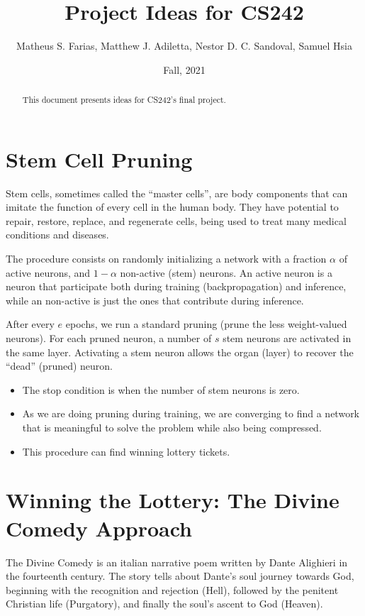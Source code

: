 \documentclass[abstract=true]{scrartcl}
\begin{document}
\title{Project Ideas for CS242}
\date{Fall, 2021}

\author{Matheus S. Farias, Matthew J. Adiletta, Nestor D. C. Sandoval, Samuel Hsia
  }

\maketitle

\begin{abstract}
    This document presents ideas for CS242's final project.
\end{abstract}

\tableofcontents

\section{Stem Cell Pruning}
Stem cells, sometimes called the ``master cells'', are body components that can imitate
the function of every cell in the human body. They have potential to repair,
restore, replace, and regenerate cells, being used to treat many medical conditions and diseases.

The procedure consists on randomly initializing a network with a fraction $\alpha$ of 
active neurons, and $1-\alpha$ non-active (stem) neurons. An active neuron is 
a neuron that participate both during training (backpropagation) and inference, while
an non-active is just the ones that contribute during inference.

After every $e$ epochs, we run a standard pruning (prune the less weight-valued neurons).
For each pruned neuron, a number of $s$ stem neurons are activated in the same layer. Activating
a stem neuron allows the organ (layer) to recover the ``dead'' (pruned) neuron.

\begin{itemize}
    \item The stop condition is when the number of stem neurons is zero.
    \item As we are doing pruning during training, we are converging to find a network that is meaningful to solve the problem while also being compressed.
    \item This procedure can find winning lottery tickets.
\end{itemize}

\section{Winning the Lottery: The Divine Comedy Approach}
The Divine Comedy is an italian narrative poem written by Dante Alighieri in the fourteenth century.
The story tells about Dante's soul journey towards God, beginning 
with the recognition and rejection (Hell), followed by the penitent Christian life (Purgatory),
and finally the soul's ascent to God (Heaven).
\end{document}
